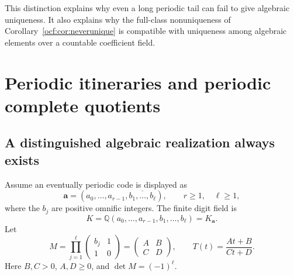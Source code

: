 \documentclass[11pt,a4paper]{article}
\numberwithin{equation}{section}
\theoremstyle{definition}
\theoremstyle{remark}
\newcommand{\Q}{\mathbb Q}
\newcommand{\C}{\mathbb C}
\newcommand{\codea}{\boldsymbol a}
\begin{document}
This distinction explains why even a long periodic tail can fail to give
algebraic uniqueness. It also explains why the full-class nonuniqueness
of Corollary~\ref{ocf:cor:neverunique} is compatible with uniqueness among
algebraic elements over a countable coefficient field.

\section{Periodic itineraries and periodic complete quotients}
\label{ocf:sec:periodic}

\subsection{A distinguished algebraic realization always exists}

Assume an eventually periodic code is displayed as
\begin{equation}\label{ocf:eq:periodiccode}
 \codea=(a_0,\ldots,a_{r-1},\overline{b_1,\ldots,b_\ell}),
 \qquad r\ge1,\quad\ell\ge1,
\end{equation}
where the $b_j$ are positive omnific integers. The finite digit field is
\[
 K=\Q(a_0,\ldots,a_{r-1},b_1,\ldots,b_\ell)=K_{\codea}.
\]
Let
\begin{equation}\label{ocf:eq:periodmatrix}
 M=\prod_{j=1}^{\ell}\begin{pmatrix}b_j&1\\1&0\end{pmatrix}
   =\begin{pmatrix}A&B\\C&D\end{pmatrix},
 \qquad T(t)=\frac{At+B}{Ct+D}.
\end{equation}
Here $B,C>0$, $A,D\ge0$, and $\det M=(-1)^\ell$.
\end{document}

